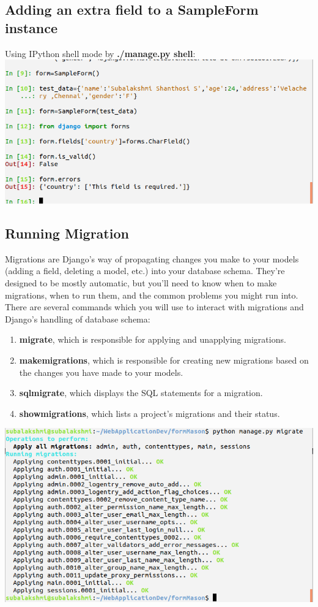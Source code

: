 \subsection{Adding an extra field to a SampleForm instance}
Using IPython shell mode by \textbf{./manage.py shell}:\\
\includegraphics[scale=0.55]{project/includingFieldsForm.png}
\newpage
\subsection{Running Migration}

Migrations are Django's way of propagating changes you make to your models (adding a field, deleting a model,
etc.) into your database schema. They're designed to be mostly automatic, but you'll need to know when to make
migrations, when to run them, and the common problems you might run into.\\

There are several commands which you will use to interact with migrations and Django's handling of database schema:
\begin{enumerate}
	\item \textbf{migrate}, which is responsible for applying and unapplying migrations.
	\item \textbf{makemigrations}, which is responsible for creating new migrations based on the changes you have made to your models.
	\item \textbf{sqlmigrate}, which displays the SQL statements for a migration.
	\item \textbf{showmigrations}, which lists a project's migrations and their status.
\end{enumerate}
\includegraphics[scale=0.55]{project/migrationRunning.png}\\

